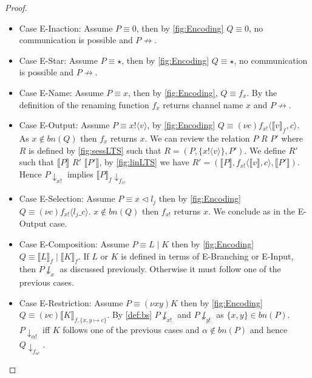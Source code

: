 \begin{proof}
\begin{itemize}
    \item Case E-Inaction: Assume $P \equiv 0$, then by \autoref{fig:Encoding} $Q \equiv 0$, no communication is possible and $P \not \rightarrow$.
    \item Case E-Star: Assume $P \equiv \star$, then by \autoref{fig:Encoding} $Q \equiv \star$, no communication is possible and $P \not \rightarrow$.
    \item Case E-Name: Assume $P \equiv x$, then by \autoref{fig:Encoding}, $Q \equiv f_x$. By the definition of the renaming function $f_x$ returns channel name $x$ and $P \not \rightarrow$.
    \item Case E-Output: Assume $P \equiv x!\langle v \rangle$, by \autoref{fig:Encoding} $Q \equiv (\nu c) f_{x!}\langle \llbracket v \rrbracket_f , c \rangle$. As $x \not \in bn(Q)$ then $f_x$ returns $x$. We can review the relation $P$ $R$ $P'$ where $R$ is defined by \autoref{fig:sessLTS} such that $R = (P, \{x!\langle v \rangle \}, P')$. We define $R'$ such that $\llbracket P \rrbracket$ $R'$ $\llbracket P' \rrbracket$, by \autoref{fig:linLTS} we have $R' = (\llbracket P \rrbracket, f_{x!}\langle \llbracket v \rrbracket, c \rangle, \llbracket P' \rrbracket)$. Hence $P \downarrow_{x!}$ implies $\llbracket P \rrbracket_f \downarrow_{f_{x!}}$
    \item Case E-Selection: Assume $P \equiv x \vartriangleleft l_j$ then by \autoref{fig:Encoding} $Q \equiv (\nu c)f_{x!} \langle l_j\_c \rangle$. $x \not \in bn(Q)$ then $f_{x!}$ returns $x$. We conclude as in the E-Output case.
    \item Case E-Composition: Assume $P \equiv L \;|\; K$ then by \autoref{fig:Encoding} $Q \equiv \llbracket L  \rrbracket_f \; | \; \llbracket K \rrbracket_f$. If $L$ or $K$ is defined in terms of E-Branching or E-Input, then $P \not \downarrow_x$ as discussed previously. Otherwise it must follow one of the previous cases.
    \item Case E-Restriction: Assume $P \equiv (\nu xy)K$ then by \autoref{fig:Encoding} $Q \equiv (\nu c) \llbracket K \rrbracket_{f, \{x, y \mapsto c\}}$. By \ref{def:bs} $P \not \downarrow_{x!}$ and $P \not \downarrow_{y!}$ as $\{x, y\} \in bn(P)$. $P \downarrow_{\alpha!}$ iff $K$ follows one of the previous cases and $\alpha \not \in bn(P)$ and hence $Q \downarrow_{f_{\alpha !}}$.
\end{itemize}
\end{proof}

\vspace{10pt}


